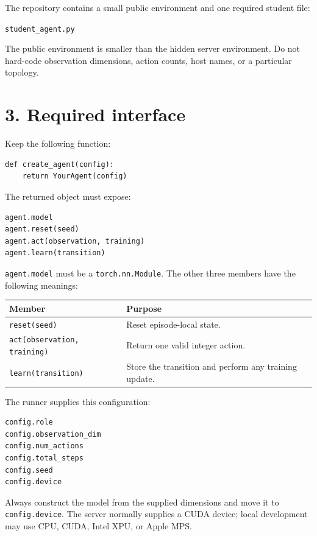 \documentclass[12pt]{report}
\begin{document}
The repository contains a small public environment and one required student
file:

\begin{center}
\texttt{student\_agent.py}
\end{center}

The public environment is smaller than the hidden server environment. Do not
hard-code observation dimensions, action counts, host names, or a particular
topology.

\section*{3. Required interface}

Keep the following function:

\begin{verbatim}
def create_agent(config):
    return YourAgent(config)
\end{verbatim}

The returned object must expose:

\begin{verbatim}
agent.model
agent.reset(seed)
agent.act(observation, training)
agent.learn(transition)
\end{verbatim}

\texttt{agent.model} must be a \texttt{torch.nn.Module}. The other three
members have the following meanings:

\begin{center}
\begin{tabular}{p{}p{}}
\toprule
\textbf{Member} & \textbf{Purpose} \\
\midrule
\texttt{reset(seed)} &
Reset episode-local state. \\
\texttt{act(observation, training)} &
Return one valid integer action. \\
\texttt{learn(transition)} &
Store the transition and perform any training update. \\
\bottomrule
\end{tabular}
\end{center}

The runner supplies this configuration:

\begin{verbatim}
config.role
config.observation_dim
config.num_actions
config.total_steps
config.seed
config.device
\end{verbatim}

Always construct the model from the supplied dimensions and move it to
\texttt{config.device}. The server normally supplies a CUDA device; local
development may use CPU, CUDA, Intel XPU, or Apple MPS.
\end{document}
